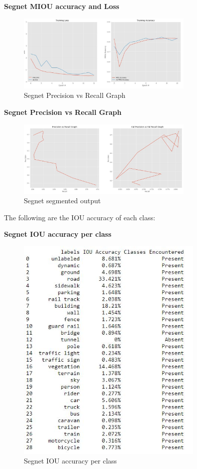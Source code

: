 \documentclass{IEEEtran}
\begin{document}
\newpage
\textbf{Segnet MIOU accuracy and Loss}

\begin{figure}[h]
    \centering
    \captionsetup{justification=centering}
    \includegraphics[width=8.5cm]{Segnet-cityscrapes-B16-gr.JPG}
    \caption{Segnet Precision vs Recall Graph}
    \label{fig:Binary class segmented output}
\end{figure}

\textbf{Segnet Precision vs Recall Graph}

\begin{figure}[h]
    \centering
    \captionsetup{justification=centering}
    \includegraphics[width=8.5cm]{Segnet-cityscrapes-B16-p-vs-re.JPG}
    \caption{Segnet segmented output}
    \label{fig:Binary class segmented output}
\end{figure}

The following are the IOU accuracy of each class:

\textbf{Segnet IOU accuracy per class}

\begin{figure}[h]
    \centering
    \captionsetup{justification=centering}
    \includegraphics[width=9cm]{Segnet-cityscrapes-B16-IOU-C29.JPG}
    \caption{Segnet IOU accuracy per class}
    \label{fig:Binary class segmented output}
\end{figure}
\end{document}
